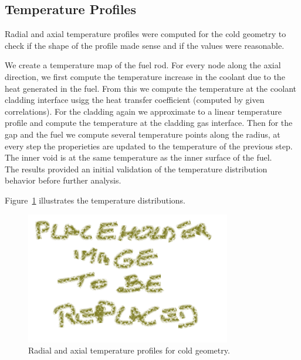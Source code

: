 \subsection{Temperature Profiles}
Radial and axial temperature profiles were computed for the cold geometry to check if the shape of the profile made sense and if the values were reasonable.

We create a temperature map of the fuel rod. For every node along the axial direction, we first compute the temperature increase in the coolant due to the heat generated in the fuel. 
From this we compute the temperature at the coolant cladding interface usigg the heat transfer coefficient (computed by given correlations).
For the cladding again we approximate to a linear temperature profile and compute the temperature at the cladding gas interface.
Then for the gap and the fuel we compute several temperature points along the radius, at every step the properieties are updated to the temperature of the previous step.
The inner void is at the same temperature as the inner surface of the fuel. \\

The results provided an initial validation of the temperature distribution behavior before further analysis.

Figure~\ref{fig:temperature_profile} illustrates the temperature distributions.

\begin{figure}[H]
\centering
\includegraphics[width=0.8\textwidth]{placeholder.png}
\caption{Radial and axial temperature profiles for cold geometry.}
\label{fig:temperature_profile}
\end{figure}